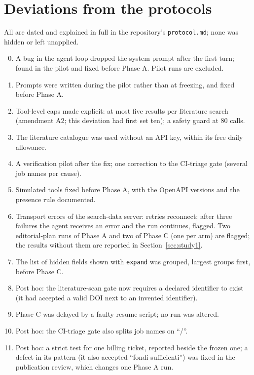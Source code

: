 \sloppy
\section{Deviations from the protocols}
\label{app:deviations}

All are dated and explained in full in the repository's \texttt{protocol.md}; none was hidden or left unapplied.

\begin{enumerate}\setcounter{enumi}{-1}
\item A bug in the agent loop dropped the system prompt after the first turn; found in the pilot and fixed before
  Phase A. Pilot runs are excluded.
\item Prompts were written during the pilot rather than at freezing, and fixed before Phase A.
\item Tool-level caps made explicit: at most five results per literature search (amendment A2; this deviation had
  first set ten); a safety guard at 80 calls.
\item The literature catalogue was used without an API key, within its free daily allowance.
\item A verification pilot after the fix; one correction to the CI-triage gate (several job names per cause).
\item Simulated tools fixed before Phase A, with the OpenAPI versions and the presence rule documented.
\item Transport errors of the search-data server: retries reconnect; after three failures the agent receives an
  error and the run continues, flagged. Two editorial-plan runs of Phase A and two of Phase C (one per arm) are
  flagged; the results without them are reported in Section~\ref{sec:study1}.
\item The list of hidden fields shown with \texttt{expand} was grouped, largest groups first, before Phase C.
\item Post hoc: the literature-scan gate now requires a declared identifier to exist (it had accepted a valid DOI
  next to an invented identifier).
\item Phase C was delayed by a faulty resume script; no run was altered.
\item Post hoc: the CI-triage gate also splits job names on ``/''.
\item Post hoc: a strict test for one billing ticket, reported beside the frozen one; a defect in its pattern
  (it also accepted ``fondi sufficienti'') was fixed in the publication review, which changes one Phase A run.

\end{enumerate}
